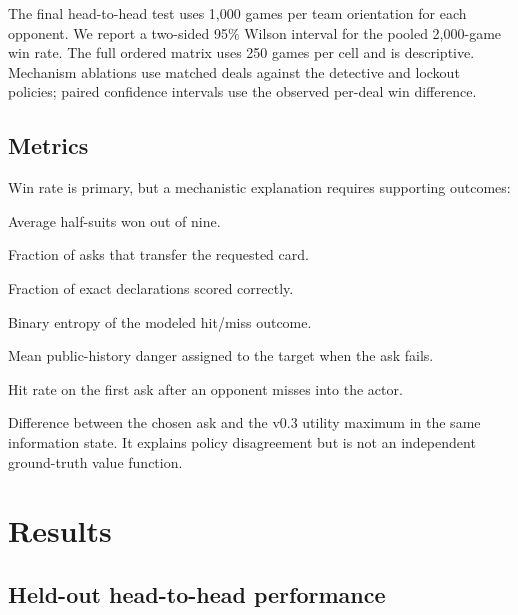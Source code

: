 \documentclass[11pt]{article}
\begin{document}
The final head-to-head test uses 1,000 games per team orientation for each opponent. We report a two-sided 95\% Wilson interval for the pooled 2,000-game win rate. The full ordered matrix uses 250 games per cell and is descriptive. Mechanism ablations use matched deals against the detective and lockout policies; paired confidence intervals use the observed per-deal win difference.

\subsection{Metrics}

Win rate is primary, but a mechanistic explanation requires supporting outcomes:

\begin{description}[style=nextline]
  \item[Mean score.] Average half-suits won out of nine.
  \item[Ask accuracy.] Fraction of asks that transfer the requested card.
  \item[Declaration accuracy.] Fraction of exact declarations scored correctly.
  \item[Information per ask.] Binary entropy of the modeled hit/miss outcome.
  \item[Reply threat on a miss.] Mean public-history danger assigned to the target when the ask fails.
  \item[Reaction accuracy.] Hit rate on the first ask after an opponent misses into the actor.
  \item[Decision regret.] Difference between the chosen ask and the v0.3 utility maximum in the same information state. It explains policy disagreement but is not an independent ground-truth value function.
\end{description}

\section{Results}

\subsection{Held-out head-to-head performance}
\end{document}
